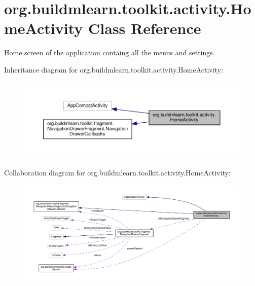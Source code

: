 \hypertarget{classorg_1_1buildmlearn_1_1toolkit_1_1activity_1_1HomeActivity}{}\section{org.\+buildmlearn.\+toolkit.\+activity.\+Home\+Activity Class Reference}
\label{classorg_1_1buildmlearn_1_1toolkit_1_1activity_1_1HomeActivity}


Home screen of the application containg all the menus and settings.  




Inheritance diagram for org.\+buildmlearn.\+toolkit.\+activity.\+Home\+Activity\+:
\nopagebreak
\begin{figure}[H]
\begin{center}
\leavevmode
\includegraphics[width=350pt]{classorg_1_1buildmlearn_1_1toolkit_1_1activity_1_1HomeActivity__inherit__graph}
\end{center}
\end{figure}


Collaboration diagram for org.\+buildmlearn.\+toolkit.\+activity.\+Home\+Activity\+:
\nopagebreak
\begin{figure}[H]
\begin{center}
\leavevmode
\includegraphics[width=350pt]{classorg_1_1buildmlearn_1_1toolkit_1_1activity_1_1HomeActivity__coll__graph}
\end{center}
\end{figure}
